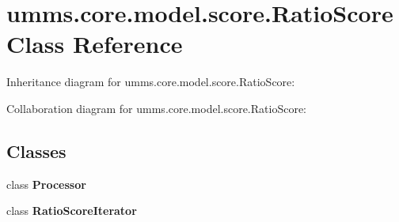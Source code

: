 \hypertarget{classumms_1_1core_1_1model_1_1score_1_1_ratio_score}{\section{umms.\+core.\+model.\+score.\+Ratio\+Score Class Reference}
\label{classumms_1_1core_1_1model_1_1score_1_1_ratio_score}
}


Inheritance diagram for umms.\+core.\+model.\+score.\+Ratio\+Score\+:


Collaboration diagram for umms.\+core.\+model.\+score.\+Ratio\+Score\+:
\subsection*{Classes}
\begin{DoxyCompactItemize}
\item 
class {\bfseries Processor}
\item 
class {\bfseries Ratio\+Score\+Iterator}
\end{DoxyCompactItemize}
